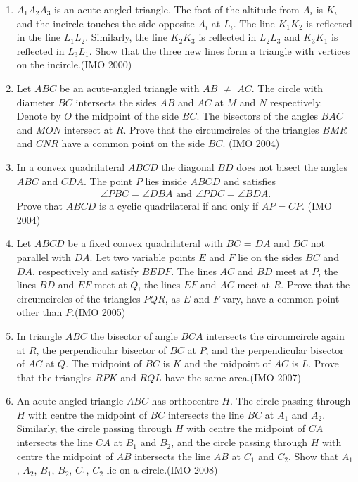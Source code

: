\begin{enumerate}[label=\thesubsection.\arabic*,ref=\thesubsection.\theenumi]
\item ${A_{1}} {A_{2}} {A_{3}}$ is an acute-angled triangle. The foot of the altitude from ${A_{i}}$ is ${K_{i}}$ and the incircle touches the side opposite ${A_{i}}$ at ${L_{i}}$. The line ${K_{1}}{K_{2}}$ is reflected in the line ${L_{1}}{L_{2}}$. Similarly, the line ${K_{2}}{K_{3}}$ is reflected in ${L_{2}}{L_{3}}$ and ${K_{3}}{K_{1}}$ is reflected in ${L_{3}}{L_{1}}$. Show that the three new lines form a triangle with vertices on the incircle.\hfill(IMO  2000)
\item Let $ABC$ be an acute-angled triangle  with $AB$ $\neq$ $AC$. The circle with diameter $BC$ intersects the sides $AB$ and $AC$ at $M$ and $N$ respectively. Denote by $O$ the midpoint of the side $BC$. The bisectors of the angles $BAC$ and $MON$ intersect at $R$. Prove that the circumcircles of the triangles $BMR$ and $CNR$ have a common point on the side $BC$. \hfill(IMO  2004)
 \item In a convex quadrilateral $ABCD$ the diagonal $BD$ does not bisect the angles $ABC$ and $CDA$. The point $P$ lies inside $ABCD$ and satisfies
 \begin{align*}
	 \angle{PBC}=\angle{DBA} \text{ and } \angle{PDC}=\angle{BDA}.
 \end{align*}
Prove that $ABCD$ is a cyclic quadrilateral if and only if $AP=CP$. \hfill(IMO  2004)
\item Let $ABCD$ be a fixed convex quadrilateral with $BC$ = $DA$ and
    $BC$ not parallel with $DA$. Let two variable points $E$ and $F$ lie on the sides $BC$ and $DA$, respectively and satisfy $BEDF$. The lines $AC$ and $BD$ meet at $P$, the lines $BD$ and $EF$ meet at $Q$, the lines $EF$ and $AC$ meet at $R$. Prove that the circumcircles of the triangles $PQR$, as $E$ and $F$ vary, have a common point other than $P$.\hfill(IMO  2005)
	\item In triangle $ABC$ the bisector of angle $BCA$ intersects the circumcircle again at $R$, the perpendicular bisector of $BC$ at $P$, and the perpendicular bisector of $AC$ at $Q$. The midpoint of $BC$ is $K$ and the midpoint of $AC$ is $L$. Prove that the triangles $RPK$ and $RQL$ have the same area.\hfill(IMO  2007)
	\item An acute-angled triangle $ABC$ has orthocentre $H$. The circle passing through $H$ with centre the midpoint of $BC$ intersects the line $BC$ at $A_1$ and $A_2$. Similarly, the circle passing through $H$ with centre the midpoint of $CA$ intersects the line $CA$ at $B_1$ and $B_2$, and the circle passing through $H$ with centre the midpoint of $AB$ intersects the line $AB$ at $C_1$ and $C_2$. Show that $A_1$, $A_2$, $B_1$, $B_2$, $C_1$, $C_2$ lie on a circle.\hfill(IMO  2008)

\end{enumerate}
